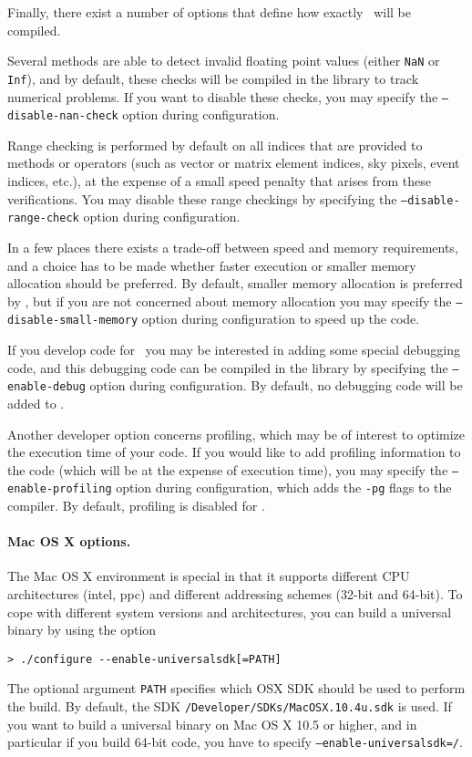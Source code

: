 \documentclass{article}[12pt,a4]
\begin{document}
Finally, there exist a number of options that define how exactly \this\ will be compiled.

Several methods are able to detect invalid floating point values (either {\tt NaN} or {\tt Inf}),
and by default, these checks will be compiled in the library to track numerical problems.
If you want to disable these checks, you may specify the {\tt --disable-nan-check} option
during configuration.

Range checking is performed by default on all indices that are provided to methods or
operators (such as vector or matrix element indices, sky pixels, event indices, etc.), at the 
expense of a small speed penalty that arises from these verifications. 
You may disable these range checkings by specifying the {\tt --disable-range-check}
option during configuration.

In a few places there exists a trade-off between speed and memory requirements, and a choice
has to be made whether faster execution or smaller memory allocation should be preferred.
By default, smaller memory allocation is preferred by \this, but if you are not concerned about
memory allocation you may specify the {\tt --disable-small-memory} option during
configuration to speed up the code.

If you develop code for \this\ you may be interested in adding some special debugging code, 
and this debugging code can be compiled in the library by specifying the
{\tt --enable-debug} option during configuration.
By default, no debugging code will be added to \this.

Another developer option concerns profiling, which may be of interest to optimize the
execution time of your code.
If you would like to add profiling information to the code (which will be at the expense of
execution time), you may specify the {\tt --enable-profiling} option during configuration,
which adds the {\tt -pg} flags to the compiler.
By default, profiling is disabled for \this.

\paragraph{Mac OS X options.}
The Mac OS X environment is special in that it supports different CPU architectures (intel, ppc)
and different addressing schemes (32-bit and 64-bit).
To cope with different system versions and architectures, you can build a universal binary
by using the option
\begin{verbatim}
> ./configure --enable-universalsdk[=PATH]
\end{verbatim}
The optional argument {\tt PATH} specifies which OSX SDK should be used to perform the 
build.
By default, the SDK {\tt /Developer/SDKs/MacOSX.10.4u.sdk} is used.
If you want to build a universal binary on Mac OS X 10.5 or higher, and in particular if you build
64-bit code, you have to specify {\tt --enable-universalsdk=/}.
\end{document}
